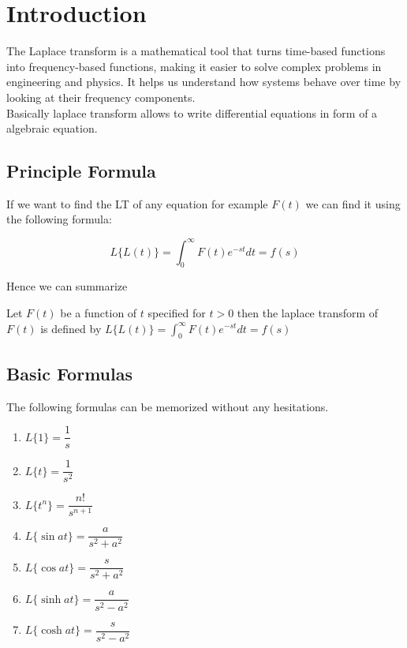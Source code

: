 
\chapter{Introduction}
The Laplace transform is a mathematical tool that turns time-based functions
into frequency-based functions, making it easier to solve complex problems in
engineering and physics. It helps us understand how systems behave over time by
looking at their frequency components.\\
Basically laplace transform allows to write differential equations in form of a
algebraic equation.

\section{Principle Formula}
If we want to find the LT of any equation for example $F(t)$ we can find it
using the following formula:

\begin{equation*}
    L\biggl\{L(t)\biggr\} = \int_0^{\infty} F(t) e^{-st} dt = f(s)
\end{equation*}

Hence we can summarize
\begin{define}
    Let $F(t)$ be a function of $t$ specified for $t>0$ then the laplace
    transform of $F(t)$ is defined by $L\biggl\{L(t)\biggr\} = \int_0^{\infty}
        F(t) e^{-st} dt = f(s)$
\end{define}

\section{Basic Formulas}
The following formulas can be memorized without any hesitations.
\begin{multicols}{2}
    \begin{enumerate}
        \item  $L\bigl\{1\bigr\} = \dfrac{1}{s}$
        \item  $L\bigl\{t\bigr\} = \dfrac{1}{s^2}$
        \item  $L\bigl\{t^n\bigr\} = \dfrac{n!}{s^{n+1}}$
        \item  $L\bigl\{\sin{at}\bigr\} = \dfrac{a}{s^2 +a^2}$
        \item  $L\bigl\{\cos{at}\bigr\} = \dfrac{s}{s^2 +a^2}$
        \item  $L\bigl\{\sinh{at}\bigr\} = \dfrac{a}{s^2 -a^2}$
        \item  $L\bigl\{\cosh{at}\bigr\} = \dfrac{s}{s^2 -a^2}$
    \end{enumerate}
\end{multicols}